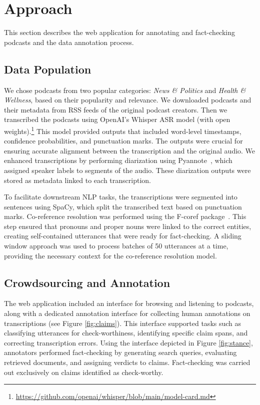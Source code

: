 


\section{Approach}

This section describes the web application for annotating and fact-checking podcasts and the data annotation process.

\subsection{Data Population}

We chose podcasts from two popular categories: \textit{News \& Politics} and \textit{Health \& Wellness}, based on their popularity and relevance. We downloaded podcasts and their metadata from RSS feeds of the original podcast creators. Then we transcribed the podcasts using OpenAI’s Whisper ASR model (with open weights).\footnote{\url{https://github.com/openai/whisper/blob/main/model-card.md}} This model provided outputs that included word-level timestamps, confidence probabilities, and punctuation marks. The outputs were crucial for ensuring accurate alignment between the transcription and the original audio. We enhanced transcriptions by performing diarization using Pyannote~\cite{Plaquet23}, which assigned speaker labels to segments of the audio. These diarization outputs were stored as metadata linked to each transcription.

To facilitate downstream NLP tasks, the transcriptions were segmented into sentences using SpaCy, which split the transcribed text based on punctuation marks. Co-reference resolution was performed using the F-coref package~\cite{otmazgin2022f}. This step ensured that pronouns and proper nouns were linked to the correct entities, creating self-contained utterances that were ready for fact-checking. A sliding window approach was used to process batches of 50 utterances at a time, providing the necessary context for the co-reference resolution model.

\subsection{Crowdsourcing and Annotation}

The web application included an interface for browsing and listening to podcasts, along with a dedicated annotation interface for collecting human annotations on transcriptions (see Figure \ref{fig:claims}). This interface supported tasks such as classifying utterances for check-worthiness, identifying specific claim spans, and correcting transcription errors. Using the interface depicted in Figure \ref{fig:stance}, annotators performed fact-checking by generating search queries, evaluating retrieved documents, and assigning verdicts to claims. Fact-checking was carried out exclusively on claims identified as check-worthy.

